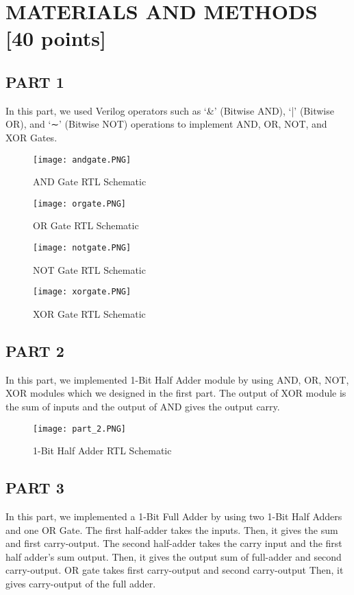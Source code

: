 \documentclass[pdftex,12pt,a4paper]{article}
\begin{document}
\section{MATERIALS AND METHODS [40 points]}



\subsection{PART 1}
In this part, we used Verilog operators such as ‘&’ (Bitwise AND), ‘|’ (Bitwise OR), and ‘∼’ (Bitwise NOT) operations to implement AND, OR, NOT, and XOR Gates.

\begin{figure}[ht]
	\centering
	\texttt{[image: andgate.PNG]}	
	\caption{AND Gate RTL Schematic}
	\label{fig1}
\end{figure}

\begin{figure}[ht]
	\centering
	\texttt{[image: orgate.PNG]}	
	\caption{OR Gate RTL Schematic}
	\label{fig2}
	
\end{figure}

\begin{figure}[ht]
	\centering
	\texttt{[image: notgate.PNG]}	
	\caption{NOT Gate RTL Schematic}
	\label{fig3}
\end{figure}

\begin{figure}[ht]
	\centering
	\texttt{[image: xorgate.PNG]}	
	\caption{XOR Gate RTL Schematic}
	\label{fig4}
\end{figure}

\clearpage


\subsection{PART 2}
In this part, we implemented 1-Bit Half Adder module by using AND, OR, NOT, XOR modules which we designed in the first part. The output of XOR module is the sum of inputs and the output of AND gives the output carry.

\begin{figure}[ht]
	\centering
	\texttt{[image: part\_2.PNG]}	
	\caption{1-Bit Half Adder RTL Schematic}
	\label{fig5}
\end{figure}

\clearpage


\subsection{PART 3}
In this part, we implemented a 1-Bit Full Adder by using two 1-Bit Half Adders and one OR Gate. The first half-adder takes the inputs. Then, it gives the sum and first carry-output. The second half-adder takes the carry input and the first half adder's sum output. Then, it gives the output sum of full-adder and second carry-output.  OR gate takes first carry-output and second carry-output Then, it gives carry-output of the full adder.
\end{document}

